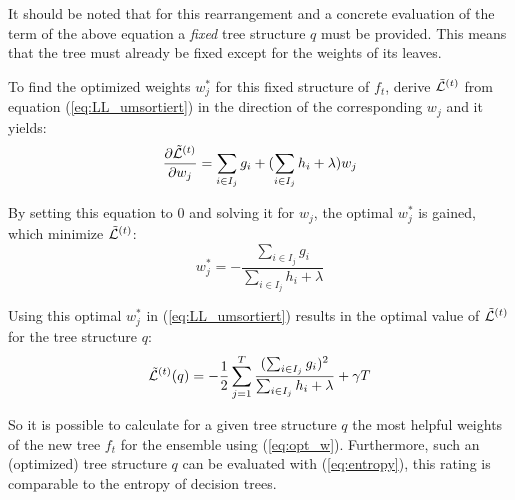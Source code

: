 It should be noted that for this rearrangement and a concrete evaluation of the term of the above equation a \textit{fixed} tree structure $q$ must be provided. This means that the tree must already be fixed except for the weights of its leaves.

To find the optimized weights $w^*_j$ for this fixed structure of $f_t$, derive $\tilde{\mathcal{L}}^{(t)}$ from equation (\ref{eq:LL_umsortiert}) in the direction of the corresponding $w_j$ and it yields:
\begin{equation} \label{eq:LL_ableitung}
\frac{\partial \tilde{\mathcal{L}}^{(t)}}{\partial w_j} = \sum_{i \in I_j} g_i + (\sum_{i \in I_j} h_i + \lambda)w_j
\end{equation}

By setting this equation to $0$ and solving it for $w_j$, the optimal $w^*_j$ is gained, which minimize $\tilde{\mathcal{L}}^{(t)}$:
\begin{equation} \label{eq:opt_w}
w_j^* = - \frac{\sum_{i \in I_j} g_i}{\sum_{i \in I_j} h_i + \lambda}
\end{equation}

Using this optimal $w_j^*$ in (\ref{eq:LL_umsortiert}) results in the optimal value of $\tilde{\mathcal{L}}^{(t)}$ for the tree structure $q$:
\begin{equation} \label{eq:entropy}
\tilde{\mathcal{L}}^{(t)} (q) = - \frac{1}{2} \sum_{j=1}^{T} \frac{(\sum_{i \in I_j} g_i)^2}{\sum_{i \in I_j} h_i + \lambda} + \gamma T
\end{equation}

So it is possible to calculate for a given tree structure $q$ the most helpful weights of the new tree $f_t$ for the ensemble using (\ref{eq:opt_w}). Furthermore, such an (optimized) tree structure $q$ can be evaluated with (\ref{eq:entropy}), this rating is comparable to the entropy of decision trees. 

